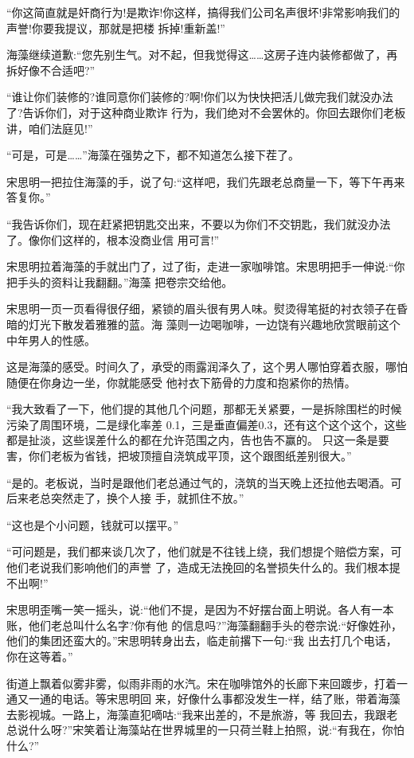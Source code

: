 \documentclass[11pt,a4paper,onecolumn]{article}
\begin{document}
``你这简直就是奸商行为!是欺诈!你这样，搞得我们公司名声很坏!非常影响我们的声誉!你要我提议，那就是把楼
拆掉!重新盖!''

海藻继续道歉:``您先别生气。对不起，但我觉得这……这房子连内装修都做了，再拆好像不合适吧?''

``谁让你们装修的?谁同意你们装修的?啊!你们以为快快把活儿做完我们就没办法了?告诉你们，对于这种商业欺诈
行为，我们绝对不会罢休的。你回去跟你们老板讲，咱们法庭见!''

``可是，可是……''海藻在强势之下，都不知道怎么接下茬了。

宋思明一把拉住海藻的手，说了句:``这样吧，我们先跟老总商量一下，等下午再来答复你。''

``我告诉你们，现在赶紧把钥匙交出来，不要以为你们不交钥匙，我们就没办法了。像你们这样的，根本没商业信
用可言!''

宋思明拉着海藻的手就出门了，过了街，走进一家咖啡馆。宋思明把手一伸说:``你把手头的资料让我翻翻。''海藻
把卷宗交给他。

宋思明一页一页看得很仔细，紧锁的眉头很有男人味。熨烫得笔挺的衬衣领子在昏暗的灯光下散发着雅雅的蓝。海
藻则一边喝咖啡，一边饶有兴趣地欣赏眼前这个中年男人的性感。

这是海藻的感受。时间久了，承受的雨露润泽久了，这个男人哪怕穿着衣服，哪怕随便在你身边一坐，你就能感受
他衬衣下筋骨的力度和抱紧你的热情。

``我大致看了一下，他们提的其他几个问题，那都无关紧要，一是拆除围栏的时候污染了周围环境，二是绿化率差
0.1，三是垂直偏差0.3，还有这个这个这个，这些都是扯淡，这些误差什么的都在允许范围之内，告也告不赢的。
只这一条是要害，你们老板为省钱，把坡顶擅自浇筑成平顶，这个跟图纸差别很大。''

``是的。老板说，当时是跟他们老总通过气的，浇筑的当天晚上还拉他去喝酒。可后来老总突然走了，换个人接
手，就抓住不放。''

``这也是个小问题，钱就可以摆平。''

``可问题是，我们都来谈几次了，他们就是不往钱上绕，我们想提个赔偿方案，可他们老说我们影响他们的声誉
了，造成无法挽回的名誉损失什么的。我们根本提不出啊!''

宋思明歪嘴一笑一摇头，说:``他们不提，是因为不好摆台面上明说。各人有一本账，他们老总叫什么名字?你有他
的信息吗?''海藻翻翻手头的卷宗说:``好像姓孙，他们的集团还蛮大的。''宋思明转身出去，临走前撂下一句:``我
出去打几个电话，你在这等着。''

街道上飘着似雾非雾，似雨非雨的水汽。宋在咖啡馆外的长廊下来回踱步，打着一通又一通的电话。等宋思明回
来，好像什么事都没发生一样，结了账，带着海藻去影视城。一路上，海藻直犯嘀咕:``我来出差的，不是旅游，等
我回去，我跟老总说什么呀?''宋笑着让海藻站在世界城里的一只荷兰鞋上拍照，说:``有我在，你怕什么?''
\end{document}
